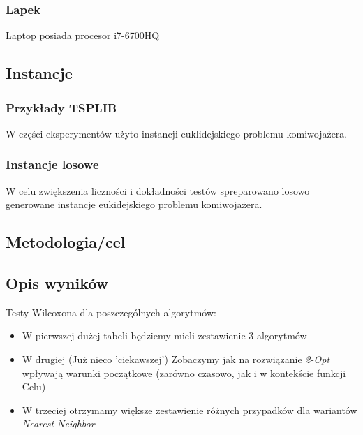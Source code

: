 \documentclass{article}
\begin{document}
\subsubsection{Lapek}
Laptop posiada procesor i7-6700HQ

\subsection{Instancje}
\subsubsection{Przykłady TSPLIB}
W części eksperymentów użyto instancji euklidejskiego problemu komiwojażera.

\subsubsection{Instancje losowe}
W celu zwiększenia liczności i dokładności testów spreparowano losowo generowane instancje eukidejskiego problemu komiwojażera.

\subsection{Metodologia/cel}

\subsection{Opis wyników}
Testy Wilcoxona dla poszczególnych algorytmów:
\begin{itemize}
	\item W pierwszej dużej tabeli będziemy mieli zestawienie 3 algorytmów
	\item W drugiej (Już nieco 'ciekawszej') Zobaczymy jak na rozwiązanie \textit{2-Opt} wpływają warunki początkowe (zarówno czasowo, jak i w kontekście funkcji Celu)
	\item W trzeciej otrzymamy większe zestawienie różnych przypadków dla wariantów \textit{Nearest Neighbor}
\end{itemize}

\newpage
\end{document}
